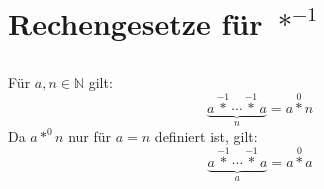 \documentclass{article}
\begin{document}
\section{Rechengesetze f\"ur $\operatorname*{\ast}^{-1}$\newline}

\subsection{}
F\"ur $a, n \in \mathbb{N}$ gilt:
\[ \underbrace{a \operatorname*{\ast}^{-1} \dotsb \operatorname*{\ast}^{-1} a}_n = a\operatorname*{\ast}^0 n \]
Da $a\operatorname*{\ast}^0 n$ nur f\"ur $a=n$ definiert ist, gilt:
\[ \underbrace{a \operatorname*{\ast}^{-1} \dotsb \operatorname*{\ast}^{-1} a}_a = a\operatorname*{\ast}^0 a \]
\end{document}
